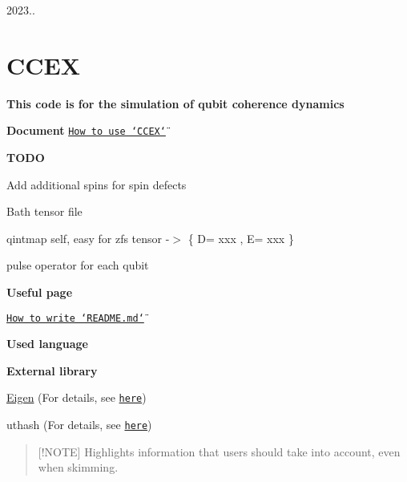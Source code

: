2023..

\section*{C\-C\-E\-X   }

\par
 {\bfseries This code is for the simulation of qubit coherence dynamics\par
}

{\bfseries Document} \href{https://cce-x-refactoring.vercel.app/index.html}{\tt How to use \char`\"{}\-C\-C\-E\-X\char`\"{}}

{\bfseries T\-O\-D\-O}
\begin{DoxyItemize}
\item Add additional spins for spin defects
\item Bath tensor file
\item qintmap self, easy for zfs tensor -\/$>$ \{ D= xxx , E= xxx \}
\item pulse operator for each qubit \par

\end{DoxyItemize}

{\bfseries Useful page}
\begin{DoxyItemize}
\item \href{https://docs.github.com/ko/get-started/writing-on-github/getting-started-with-writing-and-formatting-on-github/basic-writing-and-formatting-syntax}{\tt How to write \char`\"{}\-R\-E\-A\-D\-M\-E.\-md\char`\"{}}
\end{DoxyItemize}

{\bfseries Used language}\par
     \par


{\bfseries External library}\par
 \hyperlink{namespaceEigen}{Eigen} (For details, see \href{https://eigen.tuxfamily.org/index.php?title=Main_Page}{\tt here})\par
 uthash (For details, see \href{https://troydhanson.github.io/uthash/userguide.html#_a_hash_in_c}{\tt here})\par
 \par


\begin{quotation}
\mbox{[}!\-N\-O\-T\-E\mbox{]} Highlights information that users should take into account, even when skimming.

\end{quotation}



